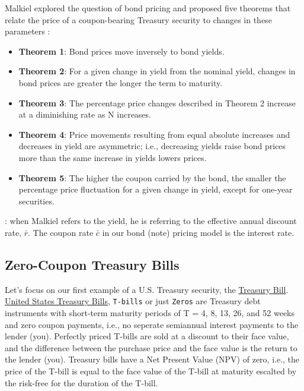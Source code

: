 \documentclass[11pt]{article}
\theoremstyle{definition}
\begin{document}
\begin{concept}\label{concept:malkiel-theorems}
	Malkiel explored the question of bond pricing and proposed five theorems that relate the price of a coupon-bearing Treasury security to changes in these parameters \citep{Malkiel-Bonds-1962}:
\begin{itemize}[leftmargin=*]
\item{\textbf{Theorem 1}: Bond prices move inversely to bond yields.}
\item{\textbf{Theorem 2}: For a given change in yield from the nominal yield, changes in bond prices are greater the longer the term to maturity. }
\item{\textbf{Theorem 3}: The percentage price changes described in Theorem 2 increase at a diminishing rate as N increases. }
\item{\textbf{Theorem 4}: Price movements resulting from equal absolute increases and decreases in yield are asymmetric; i.e., decreasing yields raise bond prices more than the same increase in yields lowers prices. }
\item{\textbf{Theorem 5}: The higher the coupon carried by the bond, the smaller the percentage price fluctuation for a given change in yield, except for one-year securities.}
\end{itemize}
\vspace{0.01in}
: when Malkiel refers to the yield, he is referring to the effective annual discount rate, $\bar{r}$. The coupon rate $\bar{c}$ in our bond (note) pricing model is the interest rate.
\end{concept}


\subsection{Zero-Coupon Treasury Bills}\label{sec:treasury-bills}
Let's focus on our first example of a U.S. Treasury security, the \href{https://treasurydirect.gov/marketable-securities/treasury-bills/}{Treasury Bill}.
\href{https://treasurydirect.gov/marketable-securities/treasury-bills/}{United States Treasury Bills}, \texttt{T-bills} or just \texttt{Zeros} are Treasury debt instruments with short-term maturity periods 
of T = 4, 8, 13, 26, and 52 weeks and zero coupon payments, i.e., no seperate semiannual interest payments to the lender (you).
Perfectly priced T-bills are sold at a discount to their face value, and the difference between the purchase price and the face value is the return to the lender (you).
Treasury bills have a Net Present Value (NPV) of zero, i.e., the price of the T-bill is equal to the face value of the T-bill at maturity 
escalted by the risk-free for the duration of the T-bill.
\end{document}
